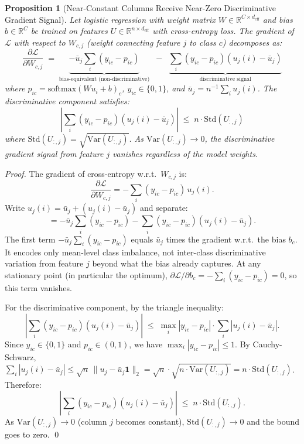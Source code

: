 \documentclass[11pt]{article}
\newtheorem{proposition}{Proposition}
\begin{document}
\begin{proposition}[Near-Constant Columns Receive Near-Zero Discriminative Gradient Signal]
\label{prop:gradient_collapse}
Let logistic regression with weight matrix $W \in \mathbb{R}^{C\times d_{\mathrm{eff}}}$
and bias $b \in \mathbb{R}^C$ be trained on features $U \in \mathbb{R}^{n\times d_{\mathrm{eff}}}$
with cross-entropy loss.
The gradient of $\mathcal{L}$ with respect to $W_{c,j}$ (weight connecting feature $j$
to class $c$) decomposes as:
\[
  \frac{\partial \mathcal{L}}{\partial W_{c,j}}
  \;=\;
  \underbrace{-\bar{u}_j \sum_i (y_{ic} - p_{ic})}_{\text{bias-equivalent (non-discriminative)}}
  \;\;-\;\;
  \underbrace{\sum_i (y_{ic} - p_{ic})(u_j(i) - \bar{u}_j)}_{\text{discriminative signal}}
\]
where $p_{ic} = \mathrm{softmax}(Wu_i + b)_c$, $y_{ic} \in \{0,1\}$, and
$\bar{u}_j = n^{-1}\sum_i u_j(i)$.
The discriminative component satisfies:
\[
  \left|\sum_i (y_{ic} - p_{ic})(u_j(i) - \bar{u}_j)\right|
  \;\leq\; n \cdot \mathrm{Std}(U_{:,j})
\]
where $\mathrm{Std}(U_{:,j}) = \sqrt{\mathrm{Var}(U_{:,j})}$.
As $\mathrm{Var}(U_{:,j}) \to 0$, the discriminative gradient signal from feature $j$
vanishes regardless of the model weights.
\end{proposition}

\begin{proof}
The gradient of cross-entropy w.r.t.\ $W_{c,j}$ is:
\[
  \frac{\partial \mathcal{L}}{\partial W_{c,j}} = -\sum_i (y_{ic} - p_{ic})\,u_j(i).
\]
Write $u_j(i) = \bar{u}_j + (u_j(i) - \bar{u}_j)$ and separate:
\[
  = -\bar{u}_j\sum_i(y_{ic} - p_{ic}) - \sum_i(y_{ic} - p_{ic})(u_j(i) - \bar{u}_j).
\]
The first term $-\bar{u}_j\sum_i(y_{ic} - p_{ic})$ equals $\bar{u}_j$ times the
gradient w.r.t.\ the bias $b_c$.
It encodes only mean-level class imbalance, not inter-class discriminative variation
from feature $j$ beyond what the bias already captures.
At any stationary point (in particular the optimum), $\partial\mathcal{L}/\partial b_c
= -\sum_i(y_{ic}-p_{ic}) = 0$, so this term vanishes.

For the discriminative component, by the triangle inequality:
\[
  \left|\sum_i(y_{ic} - p_{ic})(u_j(i)-\bar{u}_j)\right|
  \;\leq\; \max_i|y_{ic}-p_{ic}| \cdot \sum_i|u_j(i)-\bar{u}_j|.
\]
Since $y_{ic} \in \{0,1\}$ and $p_{ic} \in (0,1)$, we have $\max_i|y_{ic}-p_{ic}| \leq 1$.
By Cauchy-Schwarz, $\sum_i|u_j(i)-\bar{u}_j| \leq \sqrt{n}\,\|u_j - \bar{u}_j\mathbf{1}\|_2
= \sqrt{n}\cdot\sqrt{n\cdot\mathrm{Var}(U_{:,j})} = n\cdot\mathrm{Std}(U_{:,j})$.
Therefore:
\[
  \left|\sum_i(y_{ic}-p_{ic})(u_j(i)-\bar{u}_j)\right| \;\leq\; n\cdot\mathrm{Std}(U_{:,j}).
\]
As $\mathrm{Var}(U_{:,j}) \to 0$ (column $j$ becomes constant),
$\mathrm{Std}(U_{:,j}) \to 0$ and the bound goes to zero. \qed
\end{proof}
\end{document}
